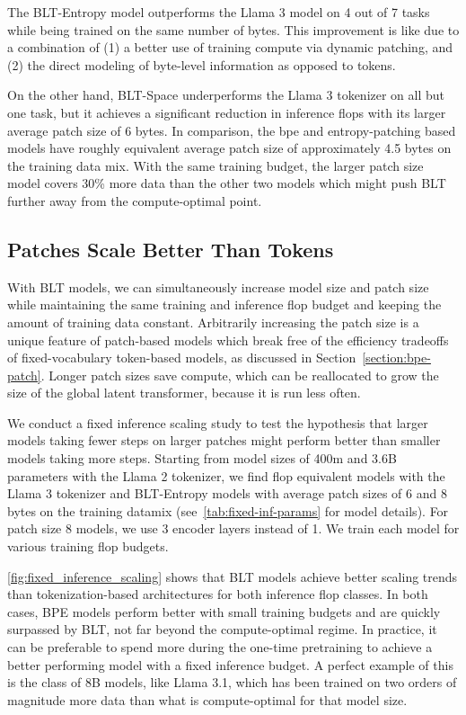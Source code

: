 The {\textsc BLT}-Entropy model outperforms the Llama 3 model on 4 out of 7 tasks while being trained on the same number of bytes. This improvement is like due to a combination of (1) a better use of training compute via dynamic patching, and (2) the direct modeling of byte-level information as opposed to tokens.

On the other hand, {\textsc BLT}-Space underperforms the Llama 3 tokenizer on all but one task, but it achieves a significant reduction in inference flops with its larger average patch size of 6 bytes. In comparison, the bpe and entropy-patching based models have roughly equivalent average patch size of approximately 4.5 bytes on the training data mix. With the same training budget, the larger patch size model covers 30\% more data than the other two models which might push {\textsc BLT} further away from the compute-optimal point.

\subsection{Patches Scale Better Than Tokens} With {\textsc BLT} models, we can simultaneously increase model size and patch size while maintaining the same training and inference flop budget and keeping the amount of training data constant. Arbitrarily increasing the patch size is a unique feature of patch-based models which break free of the efficiency tradeoffs of fixed-vocabulary token-based models, as discussed in Section~\ref{section:bpe-patch}. Longer patch sizes save compute, which can be reallocated to grow the size of the global latent transformer, because it is run less often.

We conduct a fixed inference scaling study to test the hypothesis that larger models taking fewer steps on larger patches might perform better than smaller models taking more steps. Starting from model sizes of 400m and 3.6B parameters with the Llama 2 tokenizer, we find flop equivalent models with the Llama 3 tokenizer and {\textsc BLT}-Entropy models with average patch sizes of 6 and 8 bytes on the training datamix (see~\autoref{tab:fixed-inf-params} for model details). For patch size 8 models, we use 3 encoder layers instead of 1. We train each model for various training flop budgets.

\autoref{fig:fixed_inference_scaling} shows that {\textsc BLT} models achieve better scaling trends than tokenization-based architectures for both inference flop classes. In both cases, BPE models  perform better with small training budgets and are quickly surpassed by {\textsc BLT}, not far beyond the compute-optimal regime. In practice, it can be preferable to spend more during the one-time pretraining to achieve a better performing model with a fixed inference budget. A perfect example of this is the class of 8B models, like Llama 3.1, which has been trained on two orders of magnitude more data than what is compute-optimal for that model size.

